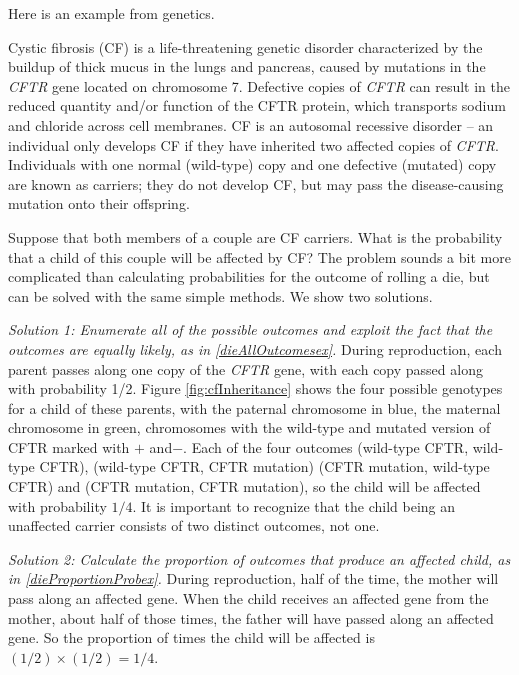 Here is an example from genetics.

\begin{example} \label{CFInheritanceExample}
Cystic fibrosis (CF) is a life-threatening genetic disorder characterized by the buildup of thick mucus in the lungs and pancreas, caused by mutations in the \textit{CFTR} gene located on chromosome 7. Defective copies of \textit{CFTR} can result in the reduced quantity and/or function of the CFTR protein, which transports sodium and chloride across cell membranes. CF is an autosomal recessive disorder -- an individual only develops CF if they have inherited two affected copies of \textit{CFTR}. Individuals with one normal (wild-type) copy and one defective (mutated) copy are known as carriers; they do not develop CF, but may pass the disease-causing mutation onto their offspring.

Suppose that both members of a couple are CF carriers. What is the probability that a child of this couple will be affected by CF?  The problem sounds a bit more complicated than calculating probabilities for the outcome of rolling a die, but can be solved with the same simple methods.  We show two solutions.

\textit{Solution 1: Enumerate all of the possible outcomes and exploit the fact that the outcomes are equally likely, as in \ref{dieAllOutcomesex}.}  During reproduction, each parent passes along one copy of the \textit{CFTR} gene, with each copy passed along with probability 1/2. Figure \ref{fig:cfInheritance} shows the four possible genotypes for a child of these parents, with the paternal chromosome in blue, the maternal chromosome in green,  chromosomes with the wild-type and mutated version of CFTR marked with $+$ and$-$.  Each of the four outcomes (wild-type CFTR, wild-type CFTR),  (wild-type CFTR, CFTR mutation) (CFTR mutation, wild-type CFTR) and (CFTR mutation, CFTR mutation), so the child will be affected with probability $1/4$.  It is important to recognize that the child being an unaffected carrier consists of two distinct outcomes, not one.

\textit{Solution 2:  Calculate the proportion of outcomes that produce an affected child, as in \ref{dieProportionProbex}.}  During reproduction, half of the time, the mother will pass along an affected gene.  When the child receives an affected gene from the mother, about half of those times, the father will have passed along an affected gene.	So the proportion of times the child will be affected is $(1/2) \times (1/2) = 1/4$.
\end{example}

